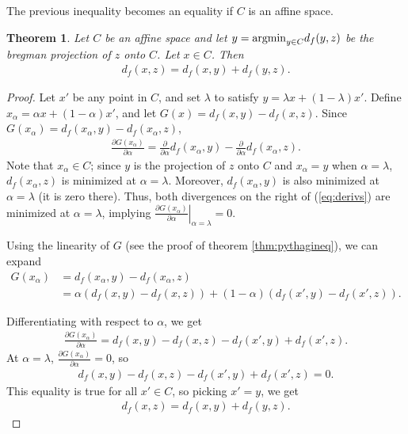 \documentclass{article}
\newtheorem{theorem}{Theorem}
\newcommand{\argmin}{\mbox{\textup{argmin}}}
\begin{document}
The previous inequality becomes an equality if $C$ is an affine space.
\begin{theorem} Let $C$ be an affine space and let $y=\argmin_{y\in C}
  d_f(y,z)$ be the bregman projection of $z$ onto $C$.  Let $x\in C$.
  Then
\begin{align*}
d_f(x,z) = d_f(x,y) + d_f(y,z).
\end{align*}
\end{theorem}
\begin{proof}
Let $x'$ be any point in $C$, and set $\lambda$ to satisfy 
$y=\lambda x+ (1-\lambda) x'$.  
Define $x_\alpha = \alpha x + (1-\alpha)
x'$, and let $G(x) = d_f(x,y) - d_f(x,z)$.  Since $G(x_\alpha) =
d_f(x_\alpha,y) - d_f(x_\alpha,z)$,
\begin{align}
\frac{\partial G(x_\alpha)}{\partial \alpha} =
\frac{\partial}{\partial \alpha} d_f(x_\alpha,y) -
\frac{\partial}{\partial \alpha} d_f(x_\alpha,z). \label{eq:derivs}
\end{align}
Note that $x_{\alpha}\in C$; since $y$ is the projection of $z$ onto
$C$ and $x_\alpha = y$ when $\alpha=\lambda$, $d_f(x_\alpha,z)$ is
minimized at $\alpha=\lambda$.  Moreover, $d_f(x_\alpha,y)$ is also
minimized at $\alpha=\lambda$ (it is zero there).  Thus, both 
divergences on the right of (\ref{eq:derivs}) are minimized at
$\alpha=\lambda$, implying $\left. \frac{\partial
  G(x_\alpha)}{\partial \alpha} \right|_{\alpha = \lambda} = 0$.

Using the linearity of $G$ (see the proof of theorem
\ref{thm:pythagineq}), we can expand 
\begin{align*} 
G(x_\alpha) &= d_f(x_\alpha,y) - d_f(x_\alpha,z) \\
&= \alpha (d_f(x,y) - d_f(x,z)) + (1-\alpha) (d_f(x',y) - d_f(x',z)).
\end{align*}

Differentiating with respect to $\alpha$, we get
\begin{align*}
\frac{\partial G(x_\alpha)}{\partial \alpha} = d_f(x,y)-d_f(x,z) - d_f(x',y)
+ d_f(x',z).
\end{align*}
At $\alpha=\lambda$, $\frac{\partial G(x_\alpha)}{\partial \alpha}=0$,
so
\begin{align*}
d_f(x,y)-d_f(x,z) - d_f(x',y)
+ d_f(x',z)=0.
\end{align*}
This equality is true for all $x' \in C$, so picking $x'=y$, we get 
\begin{align*}
d_f(x,z) = d_f(x,y) + d_f(y,z).
\end{align*}
\end{proof}
\end{document}
